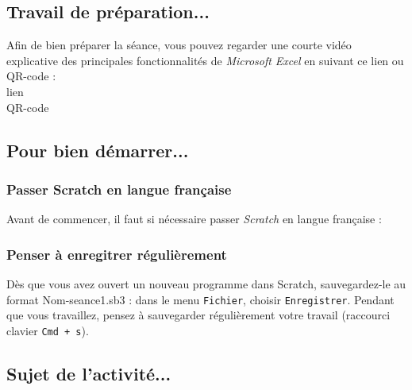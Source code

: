 \subsection{Travail de préparation...}

Afin de bien préparer la séance, vous pouvez regarder une courte vidéo explicative des principales fonctionnalités de \emph{Microsoft Excel} en suivant ce lien ou QR-code :\\

lien\\
QR-code

\subsection{Pour bien démarrer...}

\subsubsection{Passer Scratch en langue française} 

Avant de commencer, il faut si nécessaire passer \emph{Scratch} en langue française :


\subsubsection{Penser à enregitrer régulièrement}

Dès que vous avez ouvert un nouveau programme dans Scratch, sauvegardez-le au format Nom-seance1.sb3 : dans le menu \texttt{Fichier}, choisir \texttt{Enregistrer}. Pendant que vous travaillez, pensez à sauvegarder régulièrement votre travail (raccourci clavier \texttt{Cmd + s}).   

\vfill

\subsection{Sujet de l'activité...}

\vspace{10pt}



